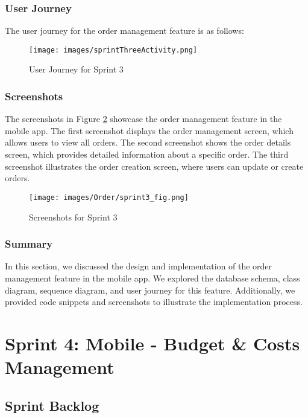 \subsubsection{User Journey}

The user journey for the order management feature is as follows:

\begin{figure}[H]
    \centering
    \texttt{[image: images/sprintThreeActivity.png]}
    \caption{User Journey for Sprint 3}
    \label{fig:activity_sprint3}
\end{figure}

\subsubsection{Screenshots}

The screenshots in Figure \ref{fig:screenshots_sprint3} showcase the order management feature in the mobile app. The first screenshot displays the order management screen, which allows users to view all orders. The second screenshot shows the order details screen, which provides detailed information about a specific order. The third screenshot illustrates the order creation screen, where users can update or create orders.

\begin{figure}[H]
    \centering
    \texttt{[image: images/Order/sprint3\_fig.png]}
    \caption{Screenshots for Sprint 3}
    \label{fig:screenshots_sprint3}
\end{figure}

\subsubsection{Summary}

In this section, we discussed the design and implementation of the order management feature in the mobile app. We explored the database schema, class diagram, sequence diagram, and user journey for this feature. Additionally, we provided code snippets and screenshots to illustrate the implementation process.

\section{Sprint 4: Mobile - Budget \& Costs Management}

\subsection{Sprint Backlog}

